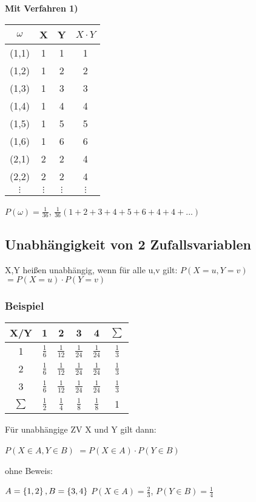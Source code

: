 \textbf{Mit Verfahren 1)}\\
\begin{tabular}{|c|c|c|c|}
\hline $\omega$ & X & Y & $X\cdot Y$ \\ 
\hline (1,1) & 1 & 1 & 1 \\ 
\hline (1,2) & 1 & 2 & 2 \\ 
\hline (1,3) & 1 & 3 & 3 \\ 
\hline (1,4) & 1 & 4 & 4 \\ 
\hline (1,5) & 1 & 5 & 5 \\ 
\hline (1,6) & 1 & 6 & 6 \\ 
\hline (2,1) & 2 & 2 & 4 \\ 
\hline (2,2) & 2 & 2 & 4 \\ 
\hline $\vdots$ & $\vdots$ & $\vdots$ & $\vdots$ \\ 
\hline 
\end{tabular} 
$P(\omega)=\frac{1}{36}$, 
$\frac{1}{36}(1+2+3+4+5+6+4+4+...)$

\subsection{Unabhängigkeit von 2 Zufallsvariablen}
X,Y heißen unabhängig, wenn für alle u,v gilt: 
$P(X=u, Y=v) $
$=P(X=u)\cdot P(Y=v)$

\subsubsection{Beispiel}
\begin{tabular}{|c|c|c|c|c|c|}
\hline X/Y & 1 & 2 & 3 & 4 & $\sum$\\ 
\hline 1 & $\frac{1}{6}$ & $\frac{1}{12}$ & $\frac{1}{24}$ & $\frac{1}{24}$ & $\frac{1}{3}$ \\ 
\hline 2 & $\frac{1}{6}$ & $\frac{1}{12}$ & $\frac{1}{24}$ & $\frac{1}{24}$ & $\frac{1}{3}$ \\ 
\hline 3 & $\frac{1}{6}$ & $\frac{1}{12}$ & $\frac{1}{24}$ & $\frac{1}{24}$ & $\frac{1}{3}$ \\ 
\hline $\sum$ & $\frac{1}{2}$ & $\frac{1}{4}$ & $\frac{1}{8}$ & $\frac{1}{8}$ & 1 \\ 
\hline 
\end{tabular} 

Für unabhängige ZV X und Y gilt dann:

$P(X\in A, Y\in B)$
$=P(X\in A) \cdot P(Y\in B)$

ohne Beweis: 

$A= \left\lbrace 1,2 \right\rbrace , B= \left\lbrace 3,4 \right\rbrace $
$P(X\in A) = \frac{2}{3}$,
$P(Y\in B) = \frac{1}{4}$

